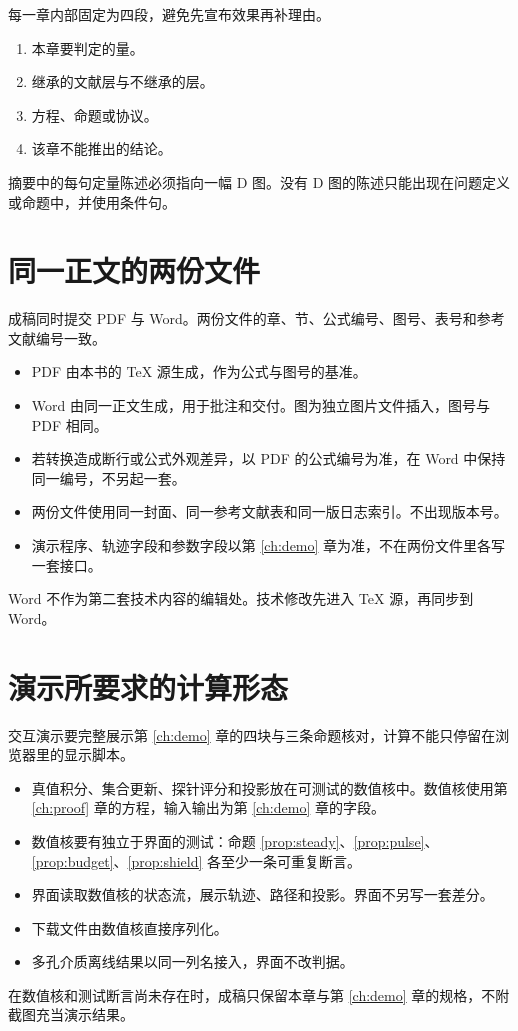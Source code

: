 每一章内部固定为四段，避免先宣布效果再补理由。

\begin{enumerate}
\item 本章要判定的量。
\item 继承的文献层与不继承的层。
\item 方程、命题或协议。
\item 该章不能推出的结论。
\end{enumerate}

摘要中的每句定量陈述必须指向一幅 D 图。没有 D 图的陈述只能出现在问题定义或命题中，并使用条件句。

\section{同一正文的两份文件}

成稿同时提交 PDF 与 Word。两份文件的章、节、公式编号、图号、表号和参考文献编号一致。

\begin{itemize}
\item PDF 由本书的 TeX 源生成，作为公式与图号的基准。
\item Word 由同一正文生成，用于批注和交付。图为独立图片文件插入，图号与 PDF 相同。
\item 若转换造成断行或公式外观差异，以 PDF 的公式编号为准，在 Word 中保持同一编号，不另起一套。
\item 两份文件使用同一封面、同一参考文献表和同一版日志索引。不出现版本号。
\item 演示程序、轨迹字段和参数字段以第 \ref{ch:demo} 章为准，不在两份文件里各写一套接口。
\end{itemize}

Word 不作为第二套技术内容的编辑处。技术修改先进入 TeX 源，再同步到 Word。

\section{演示所要求的计算形态}

交互演示要完整展示第 \ref{ch:demo} 章的四块与三条命题核对，计算不能只停留在浏览器里的显示脚本。

\begin{itemize}
\item 真值积分、集合更新、探针评分和投影放在可测试的数值核中。数值核使用第 \ref{ch:proof} 章的方程，输入输出为第 \ref{ch:demo} 章的字段。
\item 数值核要有独立于界面的测试：命题 \ref{prop:steady}、\ref{prop:pulse}、\ref{prop:budget}、\ref{prop:shield} 各至少一条可重复断言。
\item 界面读取数值核的状态流，展示轨迹、路径和投影。界面不另写一套差分。
\item 下载文件由数值核直接序列化。
\item 多孔介质离线结果以同一列名接入，界面不改判据。
\end{itemize}

在数值核和测试断言尚未存在时，成稿只保留本章与第 \ref{ch:demo} 章的规格，不附截图充当演示结果。
